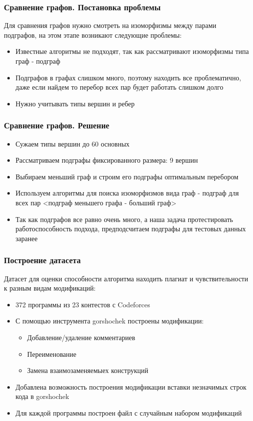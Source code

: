 \documentclass[10pt]{beamer}
\begin{document}
\begin{frame}\frametitle{Сравнение графов. Постановка проблемы}
		\item Для сравнения графов нужно смотреть на изоморфизмы между парами подграфов, на этом этапе возникают следующие проблемы:
		\begin{itemize}
		\item Известные алгоритмы не подходят, так как рассматривают изоморфизмы типа граф - подграф
		\item Подграфов в графах слишком много, поэтому находить все проблематично, даже если найдем то перебор всех пар будет работать слишком долго
		\item Нужно учитывать типы вершин и ребер
		\end{itemize}
 
\end{frame}

\begin{frame}\frametitle{Сравнение графов. Решение}
	\begin{itemize}
		\item Сужаем типы вершин до 60 основных
		\item Рассматриваем подграфы фиксированного размера: 9 вершин
		\item Выбираем меньший граф и строим его подграфы оптимальным перебором
		\item Используем алгоритмы для поиска изоморфизмов вида граф - подграф для всех пар <подграф меньшего графа - больший граф>
		\item Так как подграфов все равно очень много, а наша задача протестировать работоспособность подхода, предподсчитаем подграфы для тестовых данных заранее
	\end{itemize}
	
\end{frame}

\begin{frame}\frametitle{Построение датасета}
	Датасет для оценки способности алгоритма находить плагиат и чувствительности к разным видам модификаций:
	\begin{itemize}
		\item 372 программы из 23 контестов с Codeforces
		\item С помощью инструмента gorshochek построены модификации:
		\begin{itemize} 
			\item Добавление/удаление комментариев
			\item Переименование
			\item Замена взаимозаменяемыех конструкций
		\end{itemize}
		\item Добавлена возможность построения модификации вставки незначимых строк кода в gorshochek
		\item Для каждой программы построен файл с случайным набором модификаций
	\end{itemize}
	
\end{frame}
\end{document}

